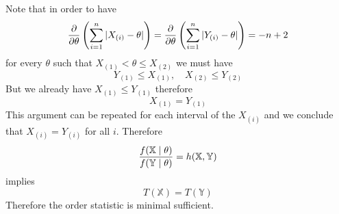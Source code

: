 \documentclass[12pt]{article}
\begin{document}
%
%
%
Note that in order to have
$$
{\partial\over\partial\theta}
\left(\sum_{i=1}^n|X_{(i)}-\theta|\right)
=
{\partial\over\partial\theta}
\left(\sum_{i=1}^n|Y_{(i)}-\theta|\right)=-n+2
$$
for every $\theta$ such that $X_{(1)}<\theta\le X_{(2)}$ we must have
$$Y_{(1)}\le X_{(1)},\quad X_{(2)}\le Y_{(2)}$$
%
%
%
But we already have $X_{(1)}\le Y_{(1)}$ therefore
$$X_{(1)}=Y_{(1)}$$
This argument can be repeated for each interval of the $X_{(i)}$
and we conclude that $X_{(i)}=Y_{(i)}$ for all $i$.
Therefore
$${f(\mathbb X\mid\theta)\over f(\mathbb Y\mid\theta)}
=h(\mathbb X,\mathbb Y)$$
implies
$$T(\mathbb X)=T(\mathbb Y)$$
Therefore the order statistic is minimal sufficient.


\end{document}
